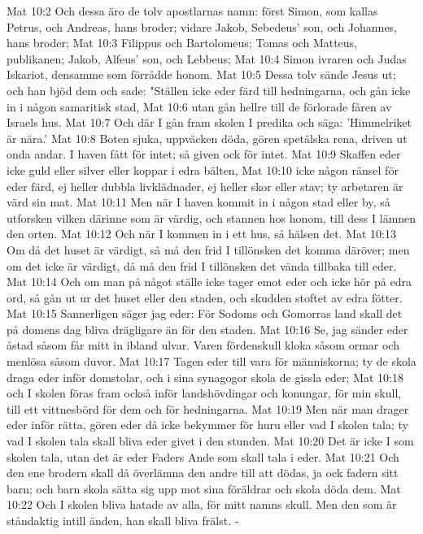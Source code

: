 Mat 10:2  Och dessa äro de tolv apostlarnas namn: först Simon, som kallas Petrus, och Andreas, hans broder; vidare Jakob, Sebedeus' son, och Johannes, hans broder;
Mat 10:3  Filippus och Bartolomeus; Tomas och Matteus, publikanen; Jakob, Alfeus' son, och Lebbeus;
Mat 10:4  Simon ivraren och Judas Iskariot, densamme som förrådde honom.
Mat 10:5  Dessa tolv sände Jesus ut; och han bjöd dem och sade: "Ställen icke eder färd till hedningarna, och gån icke in i någon samaritisk stad,
Mat 10:6  utan gån hellre till de förlorade fåren av Israels hus.
Mat 10:7  Och där I gån fram skolen I predika och säga: 'Himmelriket är nära.'
Mat 10:8  Boten sjuka, uppväcken döda, gören spetälska rena, driven ut onda andar. I haven fått för intet; så given ock för intet.
Mat 10:9  Skaffen eder icke guld eller silver eller koppar i edra bälten,
Mat 10:10  icke någon ränsel för eder färd, ej heller dubbla livklädnader, ej heller skor eller stav; ty arbetaren är värd sin mat.
Mat 10:11  Men när I haven kommit in i någon stad eller by, så utforsken vilken därinne som är värdig, och stannen hos honom, till dess I lämnen den orten.
Mat 10:12  Och när I kommen in i ett hus, så hälsen det.
Mat 10:13  Om då det huset är värdigt, så må den frid I tillönsken det komma däröver; men om det icke är värdigt, då må den frid I tillönsken det vända tillbaka till eder.
Mat 10:14  Och om man på något ställe icke tager emot eder och icke hör på edra ord, så gån ut ur det huset eller den staden, och skudden stoftet av edra fötter.
Mat 10:15  Sannerligen säger jag eder: För Sodoms och Gomorras land skall det på domens dag bliva drägligare än för den staden.
Mat 10:16  Se, jag sänder eder åstad såsom får mitt in ibland ulvar. Varen fördenskull kloka såsom ormar och menlösa såsom duvor.
Mat 10:17  Tagen eder till vara för människorna; ty de skola draga eder inför domstolar, och i sina synagogor skola de gissla eder;
Mat 10:18  och I skolen föras fram också inför landshövdingar och konungar, för min skull, till ett vittnesbörd för dem och för hedningarna.
Mat 10:19  Men när man drager eder inför rätta, gören eder då icke bekymmer för huru eller vad I skolen tala; ty vad I skolen tala skall bliva eder givet i den stunden.
Mat 10:20  Det är icke I som skolen tala, utan det är eder Faders Ande som skall tala i eder.
Mat 10:21  Och den ene brodern skall då överlämna den andre till att dödas, ja ock fadern sitt barn; och barn skola sätta sig upp mot sina föräldrar och skola döda dem.
Mat 10:22  Och I skolen bliva hatade av alla, för mitt namns skull. Men den som är ståndaktig intill änden, han skall bliva frälst. -

